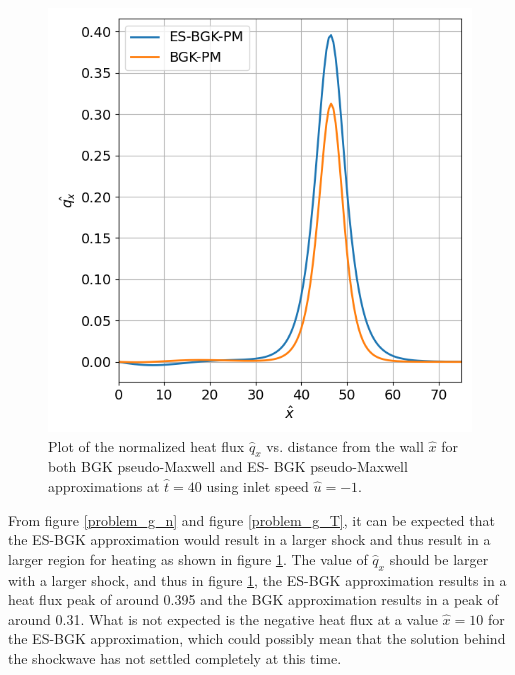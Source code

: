 \documentclass[a4paper]{article}
\begin{document}
\begin{figure}[hbt!]
    \centering
    \includegraphics[width=14cm]{plots/problem_g_q_x.png}
    \caption{\centering Plot of the normalized heat flux $\hat{q}_x$ vs. distance from the wall $\hat{x}$ for both BGK pseudo-Maxwell and ES- BGK pseudo-Maxwell approximations at $\hat{t} = 40$ using inlet speed $\hat{u} = -1$.}
    \label{problem_g_q_x}
\end{figure}
From figure \ref{problem_g_n} and figure \ref{problem_g_T}, it can be expected that the ES-BGK approximation would result in a larger shock and thus result in a larger region for heating as shown in figure \ref{problem_g_q_x}. The value of $\hat{q}_x$ should be larger with a larger shock, and thus in figure \ref{problem_g_q_x}, the ES-BGK approximation results in a heat flux peak of around 0.395 and the BGK approximation results in a peak of around 0.31. What is not expected is the negative heat flux at a value $\hat{x} = 10$ for the ES-BGK approximation, which could possibly mean that the solution behind the shockwave has not settled completely at this time. 
\clearpage
\end{document}
